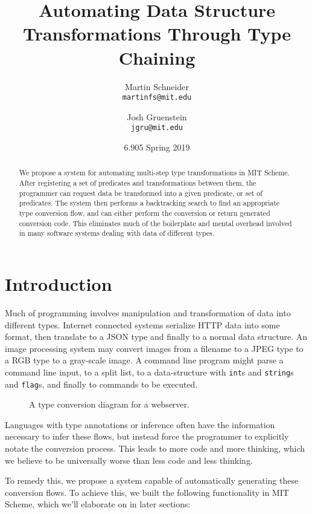\documentclass[letterpaper]{article}
\title{Automating Data Structure Transformations Through Type Chaining}
\author{
  Martin Schneider\\
  \texttt{martinfs@mit.edu} \and
  Josh Gruenstein\\
  \texttt{jgru@mit.edu}
}
\date{6.905 Spring 2019}
\begin{document}
 
\maketitle

\begin{abstract}
We propose a system for automating multi-step type transformations in MIT Scheme.  After registering a set of predicates and transformations between them, the programmer can request data be transformed into a given predicate, or set of predicates.  The system then performs a backtracking search to find an appropriate type conversion flow, and can either perform the conversion or return generated conversion code.  This eliminates much of the boilerplate and mental overhead involved in many software systems dealing with data of different types.
\end{abstract}

\section{Introduction}

Much of programming involves manipulation and transformation of data into different types.  Internet connected systems serialize HTTP data into some format, then translate to a JSON type and finally to a normal data structure.  An image processing system may convert images from a filename to a JPEG type to a RGB type to a gray-scale image.  A command line program might parse a command line input, to a split list, to a data-structure with \texttt{int}s and \texttt{string}s and \texttt{flag}s, and finally to commands to be executed.

\begin{figure}[h!]
\centering

\resizebox{14cm}{!} {
  
}

\caption{A type conversion diagram for a webserver.}
\label{webserver}
\end{figure}

Languages with type annotations or inference often have the information necessary to infer these flows, but instead force the programmer to explicitly notate the conversion process.  This leads to more code and more thinking, which we believe to be universally worse than less code and less thinking.

To remedy this, we propose a system capable of automatically generating these conversion flows.  To achieve this, we built the following functionality in MIT Scheme, which we'll elaborate on in later sections:
\end{document}
